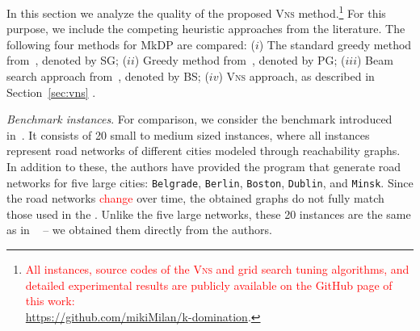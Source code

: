 \documentclass[dvipsnames,format=sigconf]{acmart} %
\begin{document}
In this section we analyze the quality of the proposed \textsc{Vns} method.\footnote{\textcolor{red}{All instances, source codes of the \textsc{Vns} and grid search tuning algorithms, and detailed experimental results are publicly available on the GitHub page of this work: \\\url{https://github.com/mikiMilan/k-domination}}.} For this purpose, we include the competing heuristic approaches from the literature. The following four methods for MkDP are compared:  
 ($i$) The standard greedy method from~\cite{parekh1991analysis,gagarin2013randomized}, denoted by SG; ($ii$) Greedy method from~\cite{gagarin2018multiple}, denoted by PG; ($iii$) Beam search approach from~\cite{corcoran2021heuristics}, denoted by BS; ($iv$) \textsc{Vns} approach, as described in Section~\ref{sec:vns} .  
 


\emph{Benchmark instances}. For comparison, we consider the benchmark introduced in~\cite{corcoran2021heuristics}. It consists of 20 small to medium sized instances, where all instances represent road networks of different cities modeled through reachability graphs. In addition to these, the authors have provided the program that generate road networks for five large cities: \texttt{Belgrade}, \texttt{Berlin}, \texttt{Boston}, \texttt{Dublin}, and \texttt{Minsk}. Since the road networks \textcolor{red}{change} over time, the obtained graphs do not fully match those used in the \cite{corcoran2021heuristics}. Unlike the five large networks, these 20 instances are the same as in ~\cite{corcoran2021heuristics} -- we obtained them directly from the authors.

\end{document}
